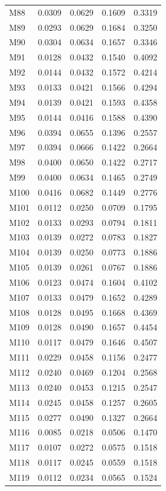\begin{longtable}{lrrrr}
M88 & 0.0309 & 0.0629 & 0.1609 & 0.3319 \\
M89 & 0.0293 & 0.0629 & 0.1684 & 0.3250 \\
M90 & 0.0304 & 0.0634 & 0.1657 & 0.3346 \\
M91 & 0.0128 & 0.0432 & 0.1540 & 0.4092 \\
M92 & 0.0144 & 0.0432 & 0.1572 & 0.4214 \\
M93 & 0.0133 & 0.0421 & 0.1566 & 0.4294 \\
M94 & 0.0139 & 0.0421 & 0.1593 & 0.4358 \\
M95 & 0.0144 & 0.0416 & 0.1588 & 0.4390 \\
M96 & 0.0394 & 0.0655 & 0.1396 & 0.2557 \\
M97 & 0.0394 & 0.0666 & 0.1422 & 0.2664 \\
M98 & 0.0400 & 0.0650 & 0.1422 & 0.2717 \\
M99 & 0.0400 & 0.0634 & 0.1465 & 0.2749 \\
M100 & 0.0416 & 0.0682 & 0.1449 & 0.2776 \\
M101 & 0.0112 & 0.0250 & 0.0709 & 0.1795 \\
M102 & 0.0133 & 0.0293 & 0.0794 & 0.1811 \\
M103 & 0.0139 & 0.0272 & 0.0783 & 0.1827 \\
M104 & 0.0139 & 0.0250 & 0.0773 & 0.1886 \\
M105 & 0.0139 & 0.0261 & 0.0767 & 0.1886 \\
M106 & 0.0123 & 0.0474 & 0.1604 & 0.4102 \\
M107 & 0.0133 & 0.0479 & 0.1652 & 0.4289 \\
M108 & 0.0128 & 0.0495 & 0.1668 & 0.4369 \\
M109 & 0.0128 & 0.0490 & 0.1657 & 0.4454 \\
M110 & 0.0117 & 0.0479 & 0.1646 & 0.4507 \\
M111 & 0.0229 & 0.0458 & 0.1156 & 0.2477 \\
M112 & 0.0240 & 0.0469 & 0.1204 & 0.2568 \\
M113 & 0.0240 & 0.0453 & 0.1215 & 0.2547 \\
M114 & 0.0245 & 0.0458 & 0.1257 & 0.2605 \\
M115 & 0.0277 & 0.0490 & 0.1327 & 0.2664 \\
M116 & 0.0085 & 0.0218 & 0.0506 & 0.1470 \\
M117 & 0.0107 & 0.0272 & 0.0575 & 0.1518 \\
M118 & 0.0117 & 0.0245 & 0.0559 & 0.1518 \\
M119 & 0.0112 & 0.0234 & 0.0565 & 0.1524 \\

\end{longtable}
